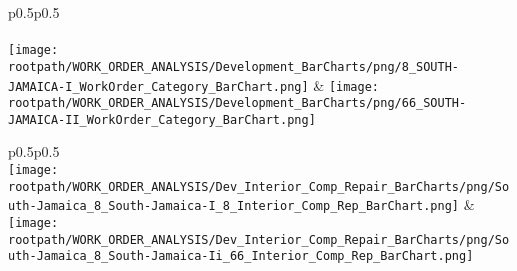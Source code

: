 \begin{center}
                                \tablehead{\hspace{1cm}\\}
                                \tabletail{\hspace{1cm}\\}
                                \begin{supertabular}{p{0.5\textwidth}p{0.5\textwidth}}
                                \shrinkheight{1in}
                                 \\
                                 \\
                                \texttt{[image: \\rootpath/WORK\_ORDER\_ANALYSIS/Development\_BarCharts/png/8\_SOUTH-JAMAICA-I\_WorkOrder\_Category\_BarChart.png]} & \texttt{[image: \\rootpath/WORK\_ORDER\_ANALYSIS/Development\_BarCharts/png/66\_SOUTH-JAMAICA-II\_WorkOrder\_Category\_BarChart.png]} \\
                                        \end{supertabular}
\end{center}

                        \begin{center}
                        \tablehead{\hspace{1cm}\\}
                        \tabletail{\hspace{1cm}\\}
                        \begin{supertabular}{p{0.5\textwidth}p{0.5\textwidth}}
                         \\
                        \texttt{[image: \\rootpath/WORK\_ORDER\_ANALYSIS/Dev\_Interior\_Comp\_Repair\_BarCharts/png/South-Jamaica\_8\_South-Jamaica-I\_8\_Interior\_Comp\_Rep\_BarChart.png]} & \texttt{[image: \\rootpath/WORK\_ORDER\_ANALYSIS/Dev\_Interior\_Comp\_Repair\_BarCharts/png/South-Jamaica\_8\_South-Jamaica-Ii\_66\_Interior\_Comp\_Rep\_BarChart.png]} \\
                                         \\
\end{supertabular}
\end{center}

